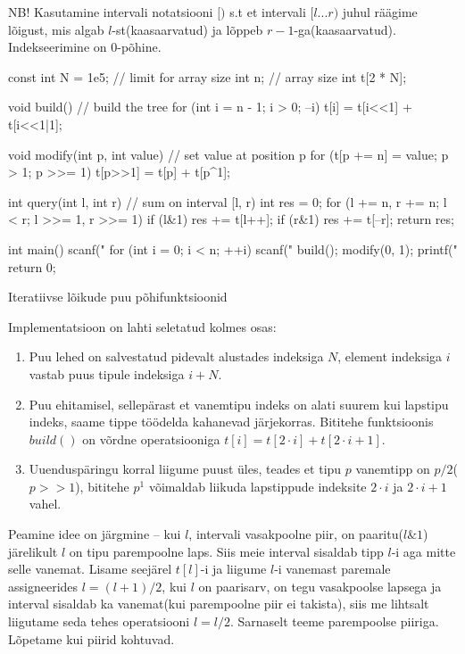 \documentclass{trkut}
\begin{document}
NB! Kasutamine intervali notatsiooni $[)$ s.t et intervali $[l...r)$ juhul räägime lõigust, mis algab $l$-st(kaasaarvatud) ja lõppeb $r-1$-ga(kaasaarvatud). Indekseerimine on 0-põhine.

\begin{cclol}
const int N = 1e5;  // limit for array size
int n;  // array size
int t[2 * N];

void build() {  // build the tree
  for (int i = n - 1; i > 0; --i) t[i] = t[i<<1] + t[i<<1|1];
}

void modify(int p, int value) {  // set value at position p
  for (t[p += n] = value; p > 1; p >>= 1) t[p>>1] = t[p] + t[p^1];
}

int query(int l, int r) {  // sum on interval [l, r)
  int res = 0;
  for (l += n, r += n; l < r; l >>= 1, r >>= 1) {
    if (l&1) res += t[l++];
    if (r&1) res += t[--r];
  }
  return res;
}

int main() {
  scanf("%
  for (int i = 0; i < n; ++i) scanf("%
  build();
  modify(0, 1);
  printf("%
  return 0;
}
\end{cclol}
 \begin{kk}[H]%
    \caption{Iteratiivse lõikude puu põhifunktsioonid}%
    \label{cfpuu}%
    \end{kk}

Implementatsioon on lahti seletatud kolmes osas:
\begin{enumerate}
    \item Puu lehed on salvestatud pidevalt alustades indeksiga $N$, element indeksiga $i$ vastab puus tipule indeksiga $i+N$.
    \item Puu ehitamisel, sellepärast et vanemtipu indeks on alati suurem kui lapstipu indeks, saame tippe töödelda kahanevad järjekorras. Bititehe funktsioonis $build()$ on võrdne operatsiooniga $t[i] = t[2\cdot i] + t[2\cdot i+1]$.
    \item Uuenduspäringu korral liigume puust üles, teades et tipu $p$ vanemtipp on $p/2$($p>>1$), bititehe $p^1$ võimaldab liikuda lapstippude indeksite $2\cdot i$ ja $2\cdot i+1$ vahel.
\end{enumerate}
\parencite{cfpuu}

Peamine idee on järgmine -- kui $l$, intervali vasakpoolne piir, on paaritu($l\&1$) järelikult $l$ on tipu parempoolne laps. Siis meie interval sisaldab tipp $l$-i aga mitte selle vanemat. Lisame seejärel $t[l]$-i ja liigume $l$-i vanemast paremale assigneerides $l=(l+1)/2$, kui $l$ on paarisarv, on tegu vasakpoolse lapsega ja interval sisaldab ka vanemat(kui parempoolne piir ei takista), siis me lihtsalt liigutame seda tehes operatsiooni $l=l/2$. Sarnaselt teeme parempoolse piiriga. Lõpetame kui piirid kohtuvad. \parencite{cfpuu}
\end{document}
